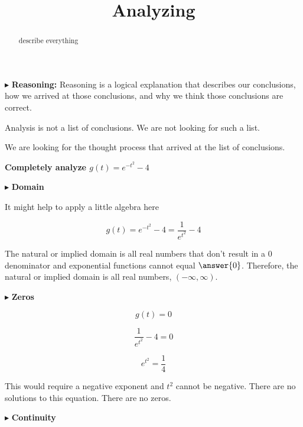 \documentclass{ximera}
\title{Analyzing}
\begin{document}
\begin{abstract}
describe everything
\end{abstract}
\maketitle









$\blacktriangleright$ \textbf{\textcolor{red!70!black}{Reasoning:}} Reasoning is a logical explanation that describes our conclusions, how we arrived at those conclusions, and why we think those conclusions are correct. 

Analysis is not a list of conclusions. We are not looking for such a list. 

We are looking for the thought process that arrived at the list of conclusions. 







\textbf{\textcolor{purple!85!blue}{Completely analyze $g(t) = e^{-t^2} - 4$}}

$\blacktriangleright$  \textbf{\textcolor{blue!55!black}{Domain}} 


It might help to apply a little algebra here


\[
g(t) = e^{-t^2} - 4 =  \frac{1}{e^{t^2}} - 4
\]



The natural or implied domain is all real numbers that don't result in a $0$ denominator and exponential functions cannot equal $\answer{0}$.  Therefore, the natural or implied domain is all real numbers, $(-\infty, \infty)$.







$\blacktriangleright$  \textbf{\textcolor{blue!55!black}{Zeros}} 

\[
g(t) = 0
\]



\[
\frac{1}{e^{t^2}} - 4 = 0
\]


\[
e^{t^2} = \frac{1}{4}
\]


This would require a negative exponent and $t^2$ cannot be negative.  There are no solutions to this equation. There are no zeros.






$\blacktriangleright$  \textbf{\textcolor{blue!55!black}{Continuity}} 
\end{document}
